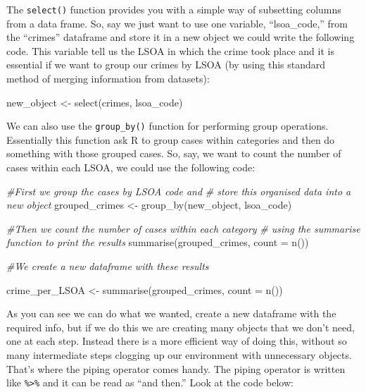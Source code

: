 \documentclass[
]{book}
\newenvironment{Shaded}{\begin{snugshade}}{\end{snugshade}}
\newcommand{\AttributeTok}[1]{\textcolor[rgb]{0.77,0.63,0.00}{#1}}
\newcommand{\CommentTok}[1]{\textcolor[rgb]{0.56,0.35,0.01}{\textit{#1}}}
\newcommand{\FunctionTok}[1]{\textcolor[rgb]{0.00,0.00,0.00}{#1}}
\newcommand{\NormalTok}[1]{#1}
\newcommand{\OtherTok}[1]{\textcolor[rgb]{0.56,0.35,0.01}{#1}}
\begin{document}
The \texttt{select()} function provides you with a simple way of subsetting columns from a data frame. So, say we just want to use one variable, ``lsoa\_code,'' from the ``crimes'' dataframe and store it in a new object we could write the following code. This variable tell us the LSOA in which the crime took place and it is essential if we want to group our crimes by LSOA (by using this standard method of merging information from datasets):

\begin{Shaded}
\begin{Highlighting}[]
\NormalTok{new\_object }\OtherTok{\textless{}{-}} \FunctionTok{select}\NormalTok{(crimes, lsoa\_code)}
\end{Highlighting}
\end{Shaded}

We can also use the \texttt{group\_by()} function for performing group operations. Essentially this function ask R to group cases within categories and then do something with those grouped cases. So, say, we want to count the number of cases within each LSOA, we could use the following code:

\begin{Shaded}
\begin{Highlighting}[]
\CommentTok{\#First we group the cases by LSOA code and }
\CommentTok{\# store this organised data into a new object}
\NormalTok{grouped\_crimes }\OtherTok{\textless{}{-}} \FunctionTok{group\_by}\NormalTok{(new\_object, lsoa\_code)}

\CommentTok{\#Then we count the number of cases within each category }
\CommentTok{\# using the summarise function to print the results}
\FunctionTok{summarise}\NormalTok{(grouped\_crimes, }\AttributeTok{count =} \FunctionTok{n}\NormalTok{())}

\CommentTok{\#We create a new dataframe with these results}

\NormalTok{crime\_per\_LSOA }\OtherTok{\textless{}{-}} \FunctionTok{summarise}\NormalTok{(grouped\_crimes, }\AttributeTok{count =} \FunctionTok{n}\NormalTok{())}
\end{Highlighting}
\end{Shaded}

As you can see we can do what we wanted, create a new dataframe with the required info, but if we do this we are creating many objects that we don't need, one at each step. Instead there is a more efficient way of doing this, without so many intermediate steps clogging up our environment with unnecessary objects. That's where the piping operator comes handy. The piping operator is written like \texttt{\%\textgreater{}\%} and it can be read as ``and then.'' Look at the code below:
\end{document}
